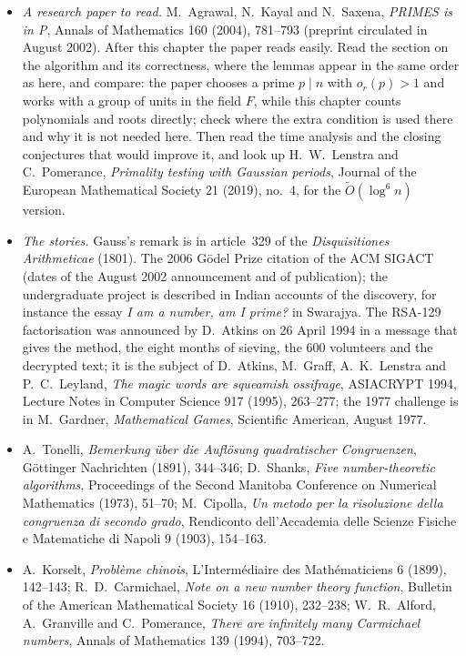 \begin{itemize}
\item \emph{A research paper to read.} M.~Agrawal, N.~Kayal and N.~Saxena, \emph{PRIMES is in P}, Annals of Mathematics 160 (2004), 781--793 (preprint circulated in August 2002). After this chapter the paper reads easily. Read the section on the algorithm and its correctness, where the lemmas appear in the same order as here, and compare: the paper chooses a prime $p\mid n$ with $o_r(p)>1$ and works with a group of units in the field $F$, while this chapter counts polynomials and roots directly; check where the extra condition is used there and why it is not needed here.
Then read the time analysis and the closing conjectures that would improve it, and look up H.~W.~Lenstra and C.~Pomerance, \emph{Primality testing with Gaussian periods}, Journal of the European Mathematical Society 21 (2019), no.~4, for the $\tilde O(\log^6n)$ version.
\item \emph{The stories.} Gauss's remark is in article~329 of the \emph{Disquisitiones Arithmeticae} (1801). The 2006 G\"odel Prize citation of the ACM SIGACT (dates of the August 2002 announcement and of publication); the undergraduate project is described in Indian accounts of the discovery, for instance the essay \emph{I am a number, am I prime?} in Swarajya. The RSA-129 factorisation was announced by D.~Atkins on 26 April 1994 in a message that gives the method, the eight months of sieving, the $600$ volunteers and the decrypted text; it is the subject of D.~Atkins, M.~Graff, A.~K.~Lenstra and P.~C.~Leyland, \emph{The magic words are squeamish ossifrage}, ASIACRYPT 1994, Lecture Notes in Computer Science 917 (1995), 263--277; the 1977 challenge is in M.~Gardner, \emph{Mathematical Games}, Scientific American, August 1977.
\item A.~Tonelli, \emph{Bemerkung \"uber die Aufl\"osung quadratischer Congruenzen}, G\"ottinger Nachrichten (1891), 344--346; D.~Shanks, \emph{Five number-theoretic algorithms}, Proceedings of the Second Manitoba Conference on Numerical Mathematics (1973), 51--70; M.~Cipolla, \emph{Un metodo per la risoluzione della congruenza di secondo grado}, Rendiconto dell'Accademia delle Scienze Fisiche e Matematiche di Napoli 9 (1903), 154--163.
\item A.~Korselt, \emph{Probl\`eme chinois}, L'Interm\'ediaire des Math\'ematiciens 6 (1899), 142--143; R.~D.~Carmichael, \emph{Note on a new number theory function}, Bulletin of the American Mathematical Society 16 (1910), 232--238; W.~R.~Alford, A.~Granville and C.~Pomerance, \emph{There are infinitely many Carmichael numbers}, Annals of Mathematics 139 (1994), 703--722.

\end{itemize}
